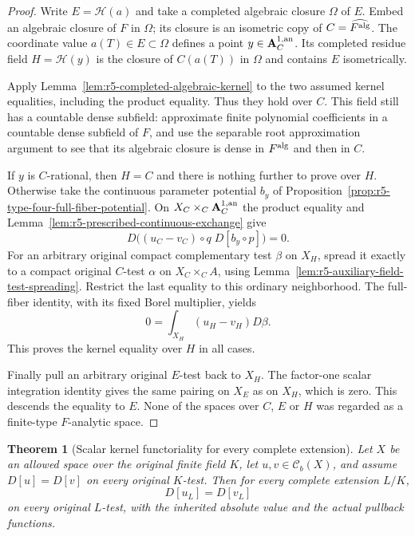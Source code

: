 \documentclass[11pt,a4paper]{article}
\numberwithin{equation}{section}
\newtheorem{theorem}{Theorem}[section]
\theoremstyle{definition}
\theoremstyle{remark}
\begin{document}
\begin{proof}
Write $E=\mathscr H(a)$ and take a completed algebraic closure
$\Omega$ of $E$.  Embed an algebraic closure of $F$ in $\Omega$;
its closure is an isometric copy of $C=\widehat{F^{\rm alg}}$.
The coordinate value $a(T)\in E\subset\Omega$ defines a point
$y\in\mathbf A_C^{1,\rm an}$.  Its completed residue field
$H=\mathscr H(y)$ is the closure of $C(a(T))$ in $\Omega$ and
contains $E$ isometrically.

Apply Lemma~\ref{lem:r5-completed-algebraic-kernel} to the two
assumed kernel equalities, including the product equality.  Thus
they hold over $C$.  This field still has a countable dense
subfield: approximate finite polynomial coefficients in a
countable dense subfield of $F$, and use the separable root
approximation argument to see that its algebraic closure is dense
in $F^{\rm alg}$ and then in $C$.

If $y$ is $C$-rational, then $H=C$ and there is nothing further
to prove over $H$.  Otherwise take the continuous parameter
potential $b_y$ of
Proposition~\ref{prop:r5-type-four-full-fiber-potential}.  On
$X_C\times_C\mathbf A_C^{1,\rm an}$ the product equality and
Lemma~\ref{lem:r5-prescribed-continuous-exchange} give
\[
 D\bigl((u_C-v_C)\circ q\;D[b_y\circ p]\bigr)=0.
\]
For an arbitrary original compact complementary test $\beta$ on
$X_H$, spread it exactly to a compact original $C$-test $\alpha$
on $X_C\times_C A$, using
Lemma~\ref{lem:r5-auxiliary-field-test-spreading}.  Restrict the
last equality to this ordinary neighborhood.  The full-fiber
identity, with its fixed Borel multiplier, yields
\[
 0=\int_{X_H}(u_H-v_H)D\beta.
\]
This proves the kernel equality over $H$ in all cases.

Finally pull an arbitrary original $E$-test back to $X_H$.  The
factor-one scalar integration identity gives the same pairing on
$X_E$ as on $X_H$, which is zero.  This descends the equality to
$E$.  None of the spaces over $C$, $E$ or $H$ was regarded as a
finite-type $F$-analytic space.
\end{proof}

\begin{theorem}[Scalar kernel functoriality for every complete extension]
\label{thm:r5-all-complete-scalar-kernel}
Let $X$ be an allowed space over the original finite field $K$,
let $u,v\in\mathcal C_b(X)$, and assume $D[u]=D[v]$ on every
original $K$-test.  Then for every complete extension $L/K$,
\[
 D[u_L]=D[v_L]
\]
on every original $L$-test, with the inherited absolute value and
the actual pullback functions.
\end{theorem}
\end{document}
